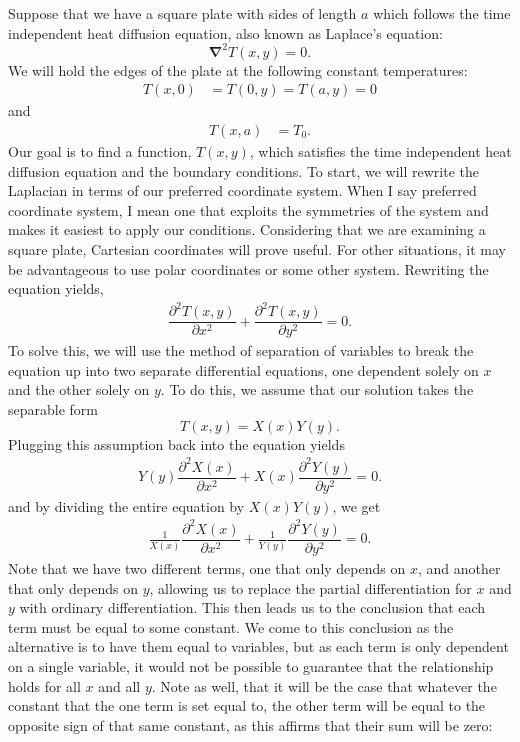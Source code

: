 \documentclass[11pt]{report}
\newcommand{\sdel}[2]{\dfrac{\partial^2{#1}}{\partial{#2}^2}} %
\newcommand{\del}{\pmb{\nabla}}
\begin{document}
Suppose that we have a square plate with sides of length $a$ which follows the time independent heat diffusion equation, also known as Laplace's equation:
    \begin{equation*}
        \del^2T(x,y) = 0.
    \end{equation*}
We will hold the edges of the plate at the following constant temperatures:
    \begin{align*}
        T(x,0) &= T(0,y) = T(a,y) = 0
    \end{align*}
and
    \begin{align*}
        T(x,a) &= T_0.
    \end{align*}
Our goal is to find a function, $T(x,y)$, which satisfies the time independent heat diffusion equation and the boundary conditions. To start, we will rewrite the Laplacian in terms of our preferred coordinate system. When I say preferred coordinate system, I mean one that exploits the symmetries of the system and makes it easiest to apply our conditions. Considering that we are examining a square plate, Cartesian coordinates will prove useful. For other situations, it may be advantageous to use polar coordinates or some other system. Rewriting the equation yields,
    \begin{align*}
        \sdel{T(x,y)}{x}+\sdel{T(x,y)}{y} = 0.
    \end{align*}
To solve this, we will use the method of separation of variables to break the equation up into two separate differential equations, one dependent solely on $x$ and the other solely on $y$. To do this, we assume that our solution takes the separable form
    \begin{equation*}
        T(x,y) = X(x)Y(y).
    \end{equation*}
Plugging this assumption back into the equation yields
    \begin{align*}
        Y(y)\sdel{X(x)}{x}+X(x)\sdel{Y(y)}{y} = 0.
    \end{align*}
and by dividing the entire equation by $X(x)Y(y)$, we get
    \begin{align*}
        \frac{1}{X(x)}\sdel{X(x)}{x} + \frac{1}{Y(y)}\sdel{Y(y)}{y} = 0.
    \end{align*}
Note that we have two different terms, one that only depends on $x$, and another that only depends on $y$, allowing us to replace the partial differentiation for $x$ and $y$ with ordinary differentiation. This then leads us to the conclusion that each term must be equal to some constant. We come to this conclusion as the alternative is to have them equal to variables, but as each term is only dependent on a single variable, it would not be possible to guarantee that the relationship holds for all $x$ and all $y$. Note as well, that it will be the case that whatever the constant that the one term is set equal to, the other term will be equal to the opposite sign of that same constant, as this affirms that their sum will be zero:
\end{document}
